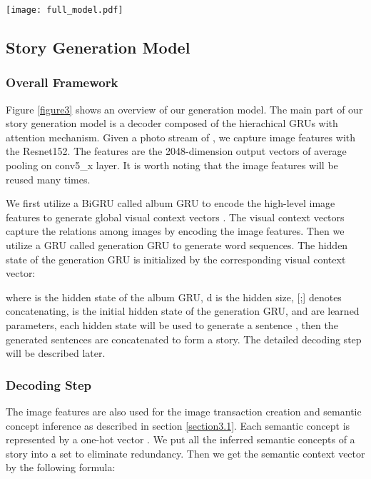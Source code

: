 \documentclass[sigconf]{acmart}
\begin{document}
\begin{figure*}[t] 
\centering 
\texttt{[image: full\_model.pdf]} 
\caption{An overview of our story generation model. It contains an album GRU in red and a generation GRU in blue. We first extract image features with the Resnet152 and these features are used for the concepts inference and the generation GRU initialization. The features are also encoded to the visual context vectors and the inferred semantic concepts are fused to the semantic context vector. The input of the generation GRU is the concatenation of the last word, the visual context vector, and the semantic context vector. Finally, we concatenate all the generated sentences to form a story.} 
\label{figure3}
\end{figure*}

\subsection{Story Generation Model}
\subsubsection{Overall Framework}
Figure \ref{figure3} shows an overview of our generation model. The main part of our story generation model is a decoder composed of the hierachical GRUs with attention mechanism. Given a photo stream of , we capture image features  with the Resnet152. The features are the 2048-dimension output vectors of average pooling on conv5\_x layer. It is worth noting that the image features  will be reused many times.

We first utilize a BiGRU called album GRU to encode the high-level image features  to generate global visual context vectors . The visual context vectors capture the relations among images by encoding the image features. Then we utilize a GRU called generation GRU to generate word sequences. The hidden state  of the generation GRU is initialized by the corresponding visual context vector:

where  is the hidden state of the album GRU, d is the hidden size, [;] denotes concatenating,  is the initial hidden state of the generation GRU,  and  are learned parameters, each hidden state  will be used to generate a sentence , then the generated sentences are concatenated to form a story. The detailed decoding step will be described later. 

\subsubsection{Decoding Step}
The image features  are also used for the image transaction creation and semantic concept inference as described in section \ref{section3.1}. Each semantic concept is represented by a one-hot vector . We put all the inferred semantic concepts of a story into a set  to eliminate redundancy. Then we get the semantic context vector  by the following formula:
\end{document}
